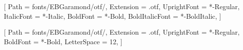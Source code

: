 \newfontfamily{}[
  Path = fonts/EBGaramond/otf/, Extension = .otf,
  UprightFont = *-Regular, ItalicFont = *-Italic,
  BoldFont = *-Bold, BoldItalicFont = *-BoldItalic,
]

%
\newfontfamily{}[
  Path = fonts/EBGaramond/otf/, Extension = .otf,
  UprightFont = *-Regular, BoldFont = *-Bold,
  LetterSpace = 12,
]
\newcommand{\displaycaps}[1]{{\mcmDisplayFontLS\MakeUppercase{#1}}}

%
%
%
%

